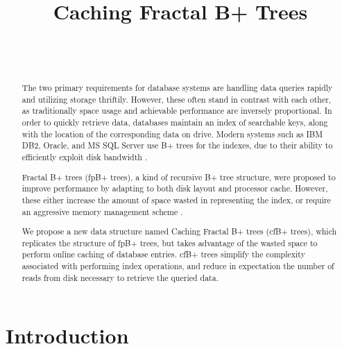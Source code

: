 \documentclass{article}
\begin{document}
\title{Caching Fractal B+ Trees}

\author{ \hfill {}\\ 
\AND
        \hfill {}\\
}

\maketitle

\begin{abstract}
The two primary requirements for database systems are handling data queries
rapidly and utilizing storage thriftily.
However, these often stand in contrast with each other,
as traditionally space usage and achievable performance are inversely
proportional.
In order to quickly retrieve data,
databases maintain an index of searchable keys, along with the location of the
corresponding data on drive.
Modern systems such as IBM DB2, Oracle, and MS SQL Server use B+ trees for the
indexes,
due to their ability to efficiently exploit disk bandwidth \citep{Gehrke:2002}.

Fractal B+ trees (fpB+ trees), a kind of recursive B+ tree structure, were
proposed to improve performance
by adapting to both disk layout and processor cache.
However, these either increase the amount of space wasted in representing the
index,
or require an aggressive memory management scheme \citep{Chen:2002}.

We propose a new data structure named Caching Fractal B+ trees (cfB+ trees),
which replicates the structure
of fpB+ trees, but takes advantage of the wasted space to perform online caching
of database entries.
cfB+ trees simplify the complexity associated with performing index operations,
and reduce in expectation the number of reads from disk necessary to retrieve
the queried data. 
\end{abstract}

\section{Introduction}
\end{document}
